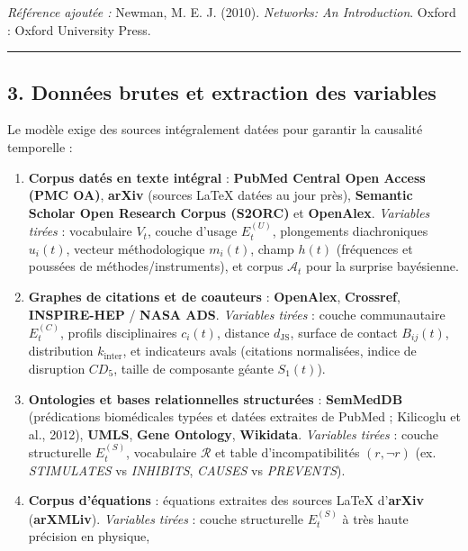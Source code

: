 \documentclass[a4paper,11pt]{article}
\providecommand{\tightlist}{\setlength{\itemsep}{0pt}\setlength{\parskip}{0pt}}
\begin{document}
\emph{Référence ajoutée :} Newman, M. E. J. (2010). \emph{Networks: An
Introduction}. Oxford : Oxford University Press.

\begin{center}\rule{0.5\linewidth}{0.5pt}\end{center}

\subsection*{3. Données brutes et extraction des variables}

Le modèle exige des sources intégralement datées pour garantir la
causalité temporelle :

\begin{enumerate}
\def\labelenumi{\arabic{enumi}.}
\tightlist
\item
  \textbf{Corpus datés en texte intégral} : \textbf{PubMed Central Open
  Access (PMC OA)}, \textbf{arXiv} (sources LaTeX datées au jour près),
  \textbf{Semantic Scholar Open Research Corpus (S2ORC)} et
  \textbf{OpenAlex}. \emph{Variables tirées} : vocabulaire \(V_t\),
  couche d'usage \(E_t^{(U)}\), plongements diachroniques \(u_i(t)\),
  vecteur méthodologique \(m_i(t)\), champ \(h(t)\) (fréquences et
  poussées de méthodes/instruments), et corpus \(\mathcal{A}_t\) pour la
  surprise bayésienne.
\item
  \textbf{Graphes de citations et de coauteurs} : \textbf{OpenAlex},
  \textbf{Crossref}, \textbf{INSPIRE-HEP} / \textbf{NASA ADS}.
  \emph{Variables tirées} : couche communautaire \(E_t^{(C)}\), profils
  disciplinaires \(c_i(t)\), distance \(d_{\mathrm{JS}}\), surface de
  contact \(B_{ij}(t)\), distribution \(k_{\mathrm{inter}}\), et
  indicateurs avals (citations normalisées, indice de disruption
  \(CD_5\), taille de composante géante \(S_1(t)\)).
\item
  \textbf{Ontologies et bases relationnelles structurées} :
  \textbf{SemMedDB} (prédications biomédicales typées et datées
  extraites de PubMed ; Kilicoglu et al., 2012), \textbf{UMLS},
  \textbf{Gene Ontology}, \textbf{Wikidata}. \emph{Variables tirées} :
  couche structurelle \(E_t^{(S)}\), vocabulaire \(\mathcal{R}\) et
  table d'incompatibilités \((r, \neg r)\) (ex. \emph{STIMULATES} vs
  \emph{INHIBITS}, \emph{CAUSES} vs \emph{PREVENTS}).
\item
  \textbf{Corpus d'équations} : équations extraites des sources LaTeX
  d'\textbf{arXiv} (\textbf{arXMLiv}). \emph{Variables tirées} : couche
  structurelle \(E_t^{(S)}\) à très haute précision en physique,

\end{enumerate}
\end{document}
